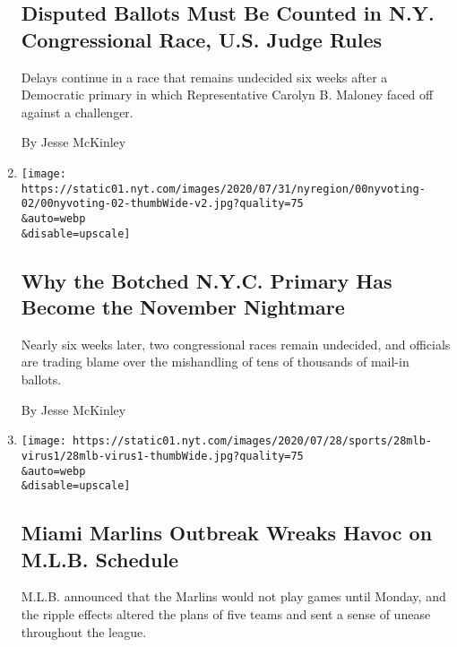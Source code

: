 \begin{enumerate}
  \hypertarget{disputed-ballots-must-be-counted-in-ny-congressional-race-us-judge-rules}{%
  \subsection{Disputed Ballots Must Be Counted in N.Y. Congressional
  Race, U.S. Judge
  Rules}\label{disputed-ballots-must-be-counted-in-ny-congressional-race-us-judge-rules}}

  Delays continue in a race that remains undecided six weeks after a
  Democratic primary in which Representative Carolyn B. Maloney faced
  off against a challenger.

  By Jesse McKinley
\item
  \href{/2020/08/03/nyregion/nyc-mail-ballots-voting.html}{}

  \texttt{[image: https://static01.nyt.com/images/2020/07/31/nyregion/00nyvoting-02/00nyvoting-02-thumbWide-v2.jpg?quality=75\\\&auto=webp\\\&disable=upscale]}

  \hypertarget{why-the-botched-nyc-primary-has-become-the-november-nightmare}{%
  \subsection{Why the Botched N.Y.C. Primary Has Become the November
  Nightmare}\label{why-the-botched-nyc-primary-has-become-the-november-nightmare}}

  Nearly six weeks later, two congressional races remain undecided, and
  officials are trading blame over the mishandling of tens of thousands
  of mail-in ballots.

  By Jesse McKinley
\item
  \href{/2020/07/28/sports/baseball/marlins-outbreak-mlb-coronavirus.html}{}

  \texttt{[image: https://static01.nyt.com/images/2020/07/28/sports/28mlb-virus1/28mlb-virus1-thumbWide.jpg?quality=75\\\&auto=webp\\\&disable=upscale]}

  \hypertarget{miami-marlins-outbreak-wreaks-havoc-on-mlb-schedule}{%
  \subsection{Miami Marlins Outbreak Wreaks Havoc on M.L.B.
  Schedule}\label{miami-marlins-outbreak-wreaks-havoc-on-mlb-schedule}}

  M.L.B. announced that the Marlins would not play games until Monday,
  and the ripple effects altered the plans of five teams and sent a
  sense of unease throughout the league.


\end{enumerate}
